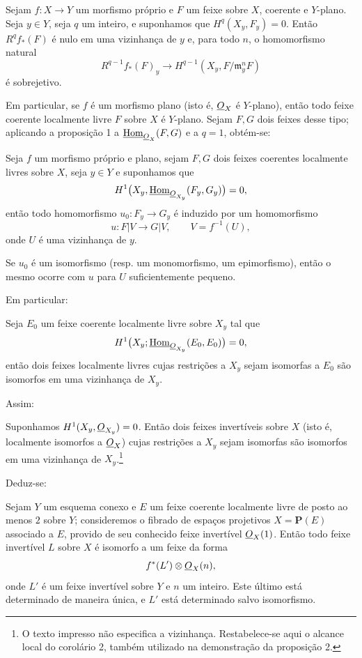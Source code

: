  Sejam $f:X\longrightarrow Y$ um morfismo próprio e $F$
um feixe sobre $X$, coerente e $Y$-plano. Seja $y\in Y$, seja $q$ um inteiro, e
suponhamos que $H^q(X_y,F_y)=0$. Então $R^qf_*(F)$ é nulo em uma vizinhança de
$y$ e, para todo $n$, o homomorfismo natural
\[
  R^{q-1}f_*(F)_y\longrightarrow
  H^{q-1}(X_y,F/\mathfrak m_y^nF)
\]
é sobrejetivo.

Em particular, se $f$ é um morfismo plano (isto é, $\underline{O}_X$ é $Y$-plano),
então todo feixe coerente localmente livre $F$ sobre $X$ é $Y$-plano. Sejam
$F,G$ dois feixes desse tipo; aplicando a proposição 1 a
$\underline{\operatorname{Hom}}_{\underline{O}_X}(F,G)$ e a $q=1$, obtém-se:

 Seja $f$ um morfismo próprio e plano, sejam $F,G$ dois feixes
coerentes localmente livres sobre $X$, seja $y\in Y$ e suponhamos que
\[
  H^1\bigl(X_y,\underline{\operatorname{Hom}}_{\underline{O}_{X_y}}(F_y,G_y)\bigr)=0,
\]
então todo homomorfismo $u_0:F_y\longrightarrow G_y$ é induzido por um
homomorfismo
\[
  u:F|V\longrightarrow G|V,
  \qquad V=f^{-1}(U),
\]
onde $U$ é uma vizinhança de $y$.

 Se $u_0$ é um isomorfismo (resp. um monomorfismo, um
epimorfismo), então o mesmo ocorre com $u$ para $U$ suficientemente
pequeno.

Em particular:

 Seja $E_0$ um feixe coerente localmente livre sobre $X_y$
tal que
\[
  H^1\bigl(X_y;\underline{\operatorname{Hom}}_{\underline{O}_{X_y}}(E_0,E_0)\bigr)=0,
\]
então dois feixes localmente livres cujas restrições a $X_y$ sejam isomorfas
a $E_0$ são isomorfos em uma vizinhança de $X_y$.

Assim:

 Suponhamos $H^1(X_y,\underline{O}_{X_y})=0$. Então dois feixes
invertíveis sobre $X$ (isto é, localmente isomorfos a $\underline{O}_X$) cujas
restrições a $X_y$ sejam isomorfas são isomorfos em uma vizinhança de $X_y$.\footnote{O texto impresso não especifica a vizinhança. Restabelece-se aqui o alcance local do corolário 2, também utilizado na demonstração da proposição 2.}

Deduz-se:

 Sejam $Y$ um esquema conexo e $E$ um feixe coerente localmente livre de posto ao menos $2$ sobre $Y$; consideremos o fibrado de espaços projetivos
$X=\mathbf P(E)$ associado a $E$, provido de seu conhecido feixe invertível
$\underline{O}_X(1)$. Então todo feixe invertível $L$ sobre $X$ é isomorfo a um feixe da
forma
\[
  f^*(L')\otimes\underline{O}_X(n),
\]
onde $L'$ é um feixe invertível sobre $Y$ e $n$ um inteiro. Este último está
determinado de maneira única, e $L'$ está determinado salvo isomorfismo.


